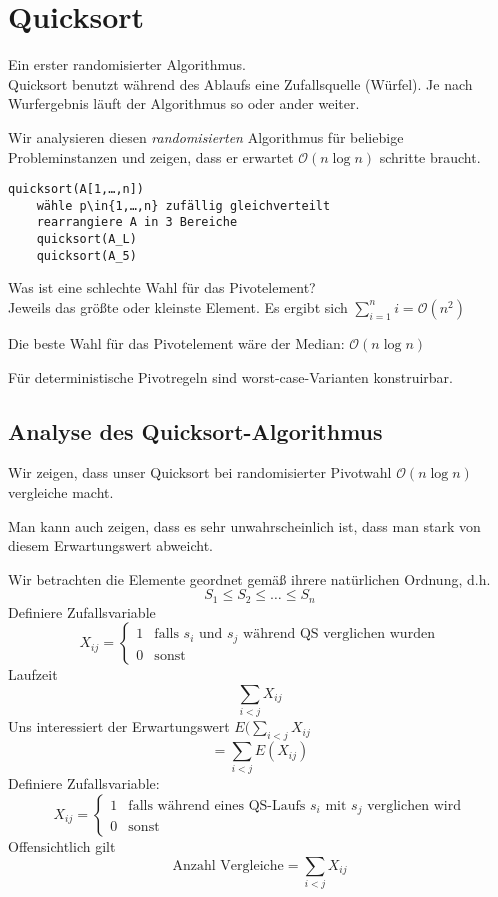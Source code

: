 \documentclass[11pt]{scrbook}
\begin{document}
\section{Quicksort}
Ein erster randomisierter Algorithmus.\\
Quicksort benutzt während des Ablaufs eine Zufallsquelle (Würfel).
Je nach Wurfergebnis läuft der Algorithmus so oder ander weiter.

Wir analysieren diesen \emph{randomisierten} Algorithmus für beliebige Probleminstanzen und zeigen, dass er erwartet $\mathcal O(n\log n)$ schritte braucht.
\begin{verbatim}
quicksort(A[1,…,n])
	wähle p\in{1,…,n} zufällig gleichverteilt
	rearrangiere A in 3 Bereiche
	quicksort(A_L)
	quicksort(A_5)
\end{verbatim}
Was ist eine schlechte Wahl für das Pivotelement?\\
Jeweils das größte oder kleinste Element. Es ergibt sich $\sum_{i=1}^ni=\mathcal O(n^2)$

Die beste Wahl für das Pivotelement wäre der Median: $\mathcal O(n\log n)$

\begin{note}
Für deterministische Pivotregeln sind worst-case-Varianten konstruirbar.
\end{note}

\subsection{Analyse des Quicksort-Algorithmus}

Wir zeigen, dass unser Quicksort bei randomisierter Pivotwahl $\mathcal O(n\log n)$ vergleiche macht.
\begin{note}
Man kann auch zeigen, dass es sehr unwahrscheinlich ist, dass man stark von diesem Erwartungswert abweicht.
\end{note}
Wir betrachten die Elemente geordnet gemäß ihrere natürlichen Ordnung, d.h.
\[
S_1\le S_2\le …\le S_n
\]
Definiere Zufallsvariable
\[
X_{ij}=\begin{cases}1 &\text{falls $s_i$ und $s_j$ während QS verglichen wurden}\\
0&\text{sonst}\end{cases}
\]
Laufzeit
\[
\sum_{i<j}X_{ij}
\]
Uns interessiert der Erwartungswert $E(\sum_{i<j}X_{ij}$
\[
=\sum_{i<j}E(X_{ij})
\]
Definiere Zufallsvariable:
\[
X_{ij} = \begin{cases}
1 & \text{falls während eines QS-Laufs $s_i$ mit $s_j$ verglichen wird}\\
0 & \text{sonst}
\end{cases}
\]
Offensichtlich gilt
\[
\text{Anzahl Vergleiche} = \sum_{i<j}X_{ij}
\]
\end{document}
